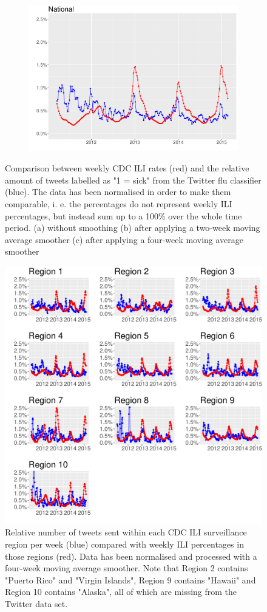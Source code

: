 \documentclass[11pt, a4paper]{report}\usepackage[]{graphicx}\usepackage[]{color}
\begin{document}
\begin{figure}[h]
  \begin{subfigure}[t]{0.6\textwidth}
  \includegraphics[width=1\linewidth,height=0.5\linewidth]{cdc_twitter_comp_nat_ma4.pdf}
  \caption{}
  \label{fig:cdc_tw_comp_nat_ma4}
  \end{subfigure}
  \caption{Comparison between weekly CDC ILI rates (red) and the relative amount of tweets labelled as "1 = sick" from the Twitter flu classifier (blue). The data has been normalised in order to make them comparable, i. e. the percentages do not represent weekly ILI percentages, but instead sum up to a 100\% over the whole time period. (a) without smoothing (b) after applying a two-week moving average smoother (c) after applying a four-week moving average smoother}
\end{figure}

\begin{figure}[h]
\centering
\includegraphics[width=1\linewidth]{cdc_twitter_comp_regs_ma4.pdf}
\caption{Relative number of tweets sent within each CDC ILI surveillance region per week (blue) compared with weekly ILI percentages in those regions (red). Data has been normalised and processed with a four-week moving average smoother. Note that Region 2 contains "Puerto Rico" and "Virgin Islands", Region 9 contains "Hawaii" and Region 10 contains "Alaska", all of which are missing from the Twitter data set.}
\label{fig:cdc_tw_comp_regs_ma4}
\end{figure}
\end{document}
